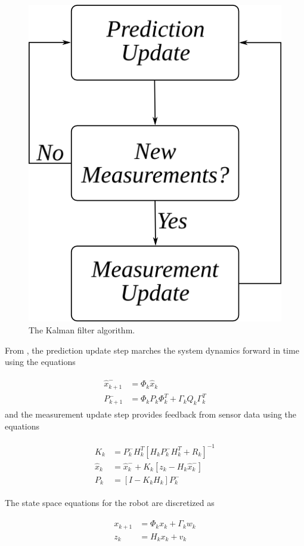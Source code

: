 \begin{figure}[ht!]
	\centering
	\includegraphics[width=.4\textwidth]{images/kf}
	\caption{The Kalman filter algorithm.}
	\label{fig:kf}
\end{figure}

From \cite{Kelly_1994_338}, \cite{Simon06OptimalEstimation} the prediction update step marches the system dynamics forward in time using the equations

\begin{align}
\label{eq:predictionupdate}
\begin{split}
\hat{x}_{k+1}^- &= \Phi_k\hat{x}_k \\
P_{k+1}^- &= \Phi_kP_k\Phi_k^T + \Gamma_kQ_k\Gamma_k^T
\end{split}
\end{align}
and the measurement update step provides feedback from sensor data using the equations

\begin{align}
\label{eq:measurementupdate}
\begin{split}
K_k &= P_k^-H_k^T\left[H_kP_k^-H_k^T + R_k\right]^{-1} \\
\hat{x}_k &= \hat{x}_k^- + K_k\left[z_k - H_k\hat{x}_k^-\right] \\
P_k &= \left[I - K_kH_k\right]P_k^-
\end{split}
\end{align}

The state space equations for the robot are discretized as

\begin{align}
\label{eq:discretess}
\begin{split}
x_{k+1} &= \Phi_kx_k + \Gamma_kw_k \\
z_k &= H_kx_k + v_k
\end{split}
\end{align}

